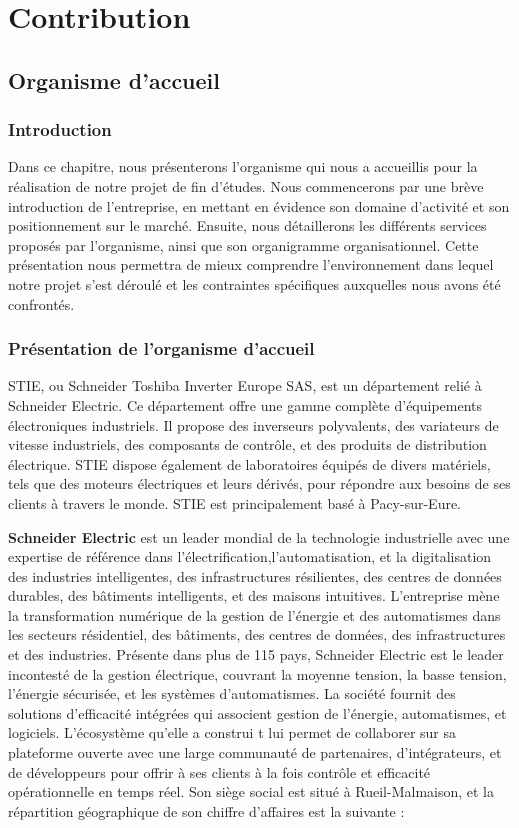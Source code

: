 \part{Contribution}

\chapter{Organisme d’accueil}

\section{Introduction}
Dans ce chapitre, nous présenterons l’organisme qui nous a accueillis pour la
réalisation de notre projet de fin d’études. Nous commencerons par une brève
introduction de l’entreprise, en mettant en évidence son domaine d’activité et
son positionnement sur le marché. Ensuite, nous détaillerons les différents
services proposés par l’organisme, ainsi que son organigramme organisationnel.
Cette présentation nous permettra de mieux comprendre l’environnement dans
lequel notre projet s’est déroulé et les contraintes spécifiques auxquelles
nous avons été confrontés.

\section{Présentation de l'organisme d'accueil}
STIE, ou Schneider Toshiba Inverter Europe SAS, est un département relié à
Schneider Electric. Ce département offre une gamme complète d'équipements
électroniques industriels. Il propose des inverseurs polyvalents, des
variateurs de vitesse industriels, des composants de contrôle, et des produits
de distribution électrique. STIE dispose également de laboratoires équipés de
divers matériels, tels que des moteurs électriques et leurs dérivés, pour
répondre aux besoins de ses clients à travers le monde. STIE est principalement
basé à Pacy-sur-Eure.

\textbf{Schneider Electric} est un leader mondial de la technologie industrielle
avec une expertise de référence dans l'électrification,l'automatisation, et la
digitalisation des industries intelligentes, des infrastructures résilientes, des
centres de données durables, des bâtiments intelligents, et des maisons intuitives.
L'entreprise mène la transformation numérique de la gestion de l'énergie et des
automatismes dans les secteurs résidentiel, des bâtiments, des centres de données,
des infrastructures et des industries.
Présente dans plus de 115 pays, Schneider Electric est le leader incontesté de la
gestion électrique, couvrant la moyenne tension, la basse tension, l'énergie sécurisée, et
les systèmes d'automatismes. La société fournit des solutions d'efficacité intégrées qui
associent gestion de l'énergie, automatismes, et logiciels. L'écosystème qu'elle a construi
t lui permet de collaborer sur sa plateforme ouverte avec une large communauté de partenaires,
d'intégrateurs, et de développeurs pour offrir à ses clients à la fois contrôle et efficacité
opérationnelle en temps réel. Son siège social est situé à Rueil-Malmaison,
et la répartition géographique de son chiffre d'affaires est la suivante :

